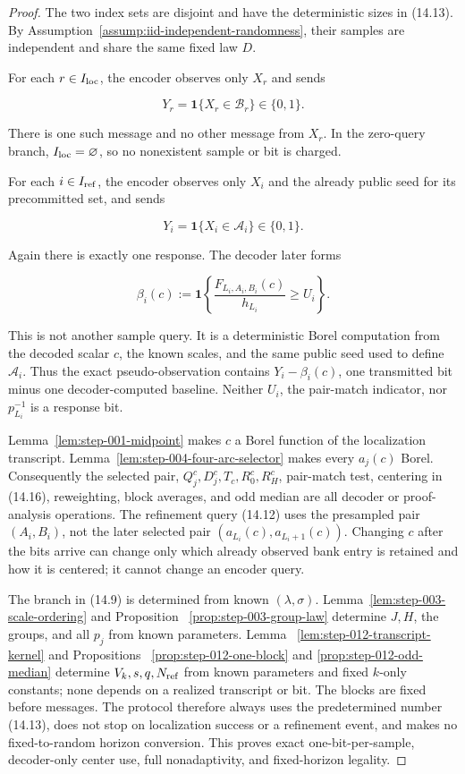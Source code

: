 \begin{proof}
The two index sets are disjoint and have the
deterministic sizes in (14.13). By
Assumption~\ref{assump:iid-independent-randomness}, their samples are
independent and share the same fixed law \(D\).

For each \(r\in I_{\rm loc}\), the encoder observes only \(X_r\) and sends

\[
Y_r=\mathbf1\{X_r\in\mathcal B_r\}\in\{0,1\}.
\tag{14.14}
\]

There is one such message and no other message from \(X_r\). In the zero-query branch, \(I_{\rm loc}=\varnothing\), so no nonexistent sample or
bit is charged.

For each \(i\in I_{\rm ref}\), the encoder observes only \(X_i\) and the
already public seed for its precommitted set, and sends

\[
Y_i=\mathbf1\{X_i\in\mathcal A_i\}\in\{0,1\}.
\tag{14.15}
\]

Again there is exactly one response. The decoder later forms

\[
\beta_i(c):=
\mathbf1\left\{
\frac{F_{L_i,A_i,B_i}(c)}{h_{L_i}}\geq U_i
\right\}.
\tag{14.16}
\]

This is not another sample query. It is a deterministic Borel computation
from the decoded scalar \(c\), the known scales, and the same public seed
used to define \(\mathcal A_i\). Thus the exact pseudo-observation contains
\(Y_i-\beta_i(c)\), one transmitted bit minus one decoder-computed baseline.
Neither \(U_i\), the pair-match indicator, nor \(p_{L_i}^{-1}\) is a
response bit.

Lemma~\ref{lem:step-001-midpoint} makes \(c\) a Borel function of the
localization transcript. Lemma~\ref{lem:step-004-four-arc-selector} makes
every \(a_j(c)\) Borel. Consequently
the selected pair, \(Q_j^c,D_j^c,T_c,R_0^c,R_H^c\), pair-match test,
centering in (14.16), reweighting, block averages, and odd median are all
decoder or proof-analysis operations. The refinement query (14.12) uses
the presampled pair \((A_i,B_i)\), not the later selected pair
\((a_{L_i}(c),a_{L_i+1}(c))\). Changing \(c\) after the bits arrive can
change only which already observed bank entry is retained and how it is
centered; it cannot change an encoder query.

The branch in (14.9) is determined from known \((\lambda,\sigma)\).
Lemma~\ref{lem:step-003-scale-ordering} and Proposition~
\ref{prop:step-003-group-law} determine \(J,H\), the groups, and all
\(p_j\) from known parameters. Lemma~
\ref{lem:step-012-transcript-kernel} and Propositions~
\ref{prop:step-012-one-block} and \ref{prop:step-012-odd-median} determine
\(V_k,s,q,N_{\rm ref}\) from known
parameters and fixed \(k\)-only constants; none depends on a realized
transcript or bit. The blocks are fixed before messages. The protocol
therefore always uses the predetermined number (14.13), does not stop on
localization success or a refinement event, and makes no fixed-to-random
horizon conversion. This proves exact one-bit-per-sample, decoder-only center
use, full nonadaptivity, and fixed-horizon legality.
\end{proof}

